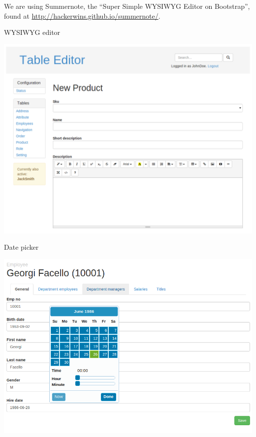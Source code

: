 We are using Summernote, the ``Super Simple WYSIWYG Editor on Bootstrap'',
found at \url{http://hackerwins.github.io/summernote/}.

\begin{frame}[plain]{WYSIWYG editor}
  \begin{center}
    \includegraphics[width=\textwidth,height=1\textheight,keepaspectratio]{images/currently-active.png}
  \end{center}
\end{frame}

\begin{frame}[plain]{Date picker}
  \begin{center}
    \includegraphics[width=\textwidth,height=1\textheight,keepaspectratio]{images/form.png}
  \end{center}
\end{frame}

